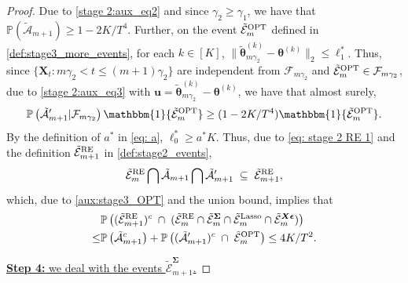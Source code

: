 \documentclass[aos,preprint]{imsart}
\theoremstyle{plain}
\theoremstyle{definition}
\newcommand{\btheta}{\boldsymbol{\theta}}
\newcommand{\bd}[1]{\boldsymbol{#1}}
\newcommand{\idf}{\mathbbm{1}}
\newcommand{\bX}{\boldsymbol{X}}
\newcommand{\bSigma}{\boldsymbol{\Sigma}}
\newcommand{\tbtheta}{\widetilde{\boldsymbol{\theta}}}
\newcommand{\bu}{\boldsymbol{u}}
\newcommand{\mE}{\mathcal{E}}
\newcommand{\bepsilon}{\bd{\epsilon}}
\newcommand{\cF}{\mathcal{F}}
\newcommand{\Pro}{\mathbb{P}}
\begin{document}
\begin{appendix}
\begin{proof}
Due to \eqref{stage 2:aux_eq2} and since $\gamma_2 \geq \gamma_1$, we have that $\Pro\left(\tilde{\mathcal{A}}_{m+1}\right) \geq 1 -2K/T^4$. Further, on the event $\tilde{\mE}_{m}^{\textup{OPT}}$ defined in \eqref{def:stage3_more_events}, for each $k \in [K]$, $\|\tbtheta_{m\gamma_2}^{(k)}-\btheta^{(k)}\|_2 \leq  \ell_1^*$. Thus, since $\{\bX_t: m\gamma_2 < t \leq (m+1)\gamma_2\}$ are independent from $\cF_{m\gamma_2}$ and $\tilde{\mE}_m^{\textup{OPT}} \in \cF_{m\gamma_2}$, due to \eqref{stage 2:aux_eq3} with $\bu =\tbtheta_{m\gamma_2}^{(k)}-\btheta^{(k)}$, we have that almost surely,
\begin{align*}
    \Pro\left(\tilde{\mathcal{A}}'_{m+1} \vert \cF_{m\gamma_2} \right) \idf\{\tilde{\mE}_{m}^{\textup{OPT}}\}  \geq (1 - 2K/T^4)\idf\{\tilde{\mE}_{m}^{\textup{OPT}}\}.
\end{align*}
By the definition of $a^*$ in \eqref{eq: a}, $\ell_0^* \geq a^* K$. Thus, due to \eqref{eq: stage 2 RE 1} and the definition $\tilde{\mE}_{m+1}^{\textup{RE}}$ in \eqref{def:stage2_events},
\begin{equation}
    \label{aux:stage3_RE}
\tilde{\mE}_{m}^{\textup{RE}} \bigcap
\tilde{\mathcal{A}}_{m+1} \bigcap \tilde{\mathcal{A}}'_{m+1}
\;\subseteq\; \tilde{\mE}_{m+1}^{\textup{RE}},
\end{equation}
which, due to \eqref{aux:stage3_OPT} and the union bound, implies that
\begin{align}
        \label{aux:stage3_step3}
        \begin{split}
            &\Pro\left(( \tilde{\mE}_{m+1}^{\textup{RE}})^c\; \cap \; (\tilde{\mE}_{m}^{\textup{RE}} \cap 
            \tilde{\mE}_{m}^{\bSigma} \cap
            \tilde{\mE}_{m}^{\textup{Lasso}} \cap    \tilde{\mE}_{m}^{\bX\bepsilon})\right) \\
\leq & \Pro\left(\tilde{\mathcal{A}}_{m+1}^c\right) + \Pro\left((\tilde{\mathcal{A}}'_{m+1})^c\; \cap \;{\tilde{\mE}_{m}^{\textup{OPT}}} \right) \leq 4K/T^2.
        \end{split}
\end{align}

\medskip
\noindent \underline{\textbf{Step 4:} we deal with the events 
$\tilde{\mE}_{m+1}^{\bSigma}$.}  


\end{proof}
\end{appendix}
\end{document}
